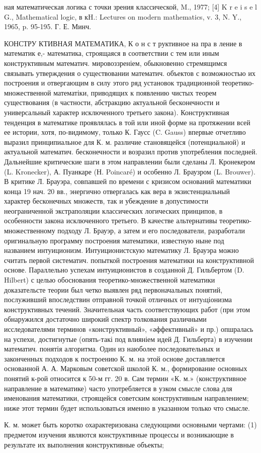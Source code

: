 \documentclass[10pt]{article}
\begin{document}
ная математическая логика с точки зрения классической, M., 1977; [4] K r e i s e l G., Mathematical logic, в кH.: Lectures on modern mathematics, v. 3, N. Y., 1965, p. 95-195. Г. Е. Минч.



КОНСТРУ КТИВНАЯ МАТЕМАТИКА, К о н с т руктивное на пра в ление в математик е,- математика, строящаяся в соответствии с тем или иным конструктивным математич. мировоззреніем, обыкновенно стремящимся связывать утверждения о существовании математич. объектов с возможностью их построения и отвергающим в силу этого ряд установок традиционной теоретико-множественной математіки, приводящих к появлению чистых теорем существования (в частности, абстракцию актуальной бесконечности и универсальный характер исключенного третьего закона). Конструктивная тенденция в математике проявлялась в той или иной форме на протяжении всей ее истории, хотя, по-видимому, только К. Гаусс (C. Gauss) впервые отчетливо выразил принципиальное для К. м. различие становящейся (потенциальной) и актуальной математич. бесконечности и возразил против употребления последней. Дальнейшие критические шаги в этом направлении были сделаны Л. Кронекером (L. Kronecker), А. Пуанкаре (Н. Poincaré) и особенно Л. Браузром (L. Brouwer). В критике Л. Брауэра, совпавшей по времени с кризисом оснований математики конца 19 нач. 20 вв., энергично отвергалась как вера в экзистенциальный характер бесконечных множеств, так и убеждение в допустимости неограниченной экстраполяции классических логических принципов, в особенности закона исключенного третьего. В качестве альтернативы теоретико-множественному подходу Л. Брауэр, а затем и его последователи, разработали оригинальную программу построения математики, известную ныне под названием интуиционизм. Интуиционистскую математику Л. Брауэра можно считать первой систематич. попыткой построения математики на конструктивной основе. Параллельно успехам интуиционистов в созданной Д. Гильбертом (D. Hilbert) с целью обоснования теоретико-множественной математики доказательсте теории был четко выявлен ряд первоначальных понятий, послуживший впоследствин отправной точкой отличных от интуıціонизма конструктивных течений. Значительная часть соответствующих работ (при этом обнаружился достаточно широкий спектр толкования различными исследователями терминов «конструктивный», «әффективный» и пр.) опшралась на успехи, достигнутые (опять-такі под влияніем идей Д. Гильберта) в изучении математич. понятія алгоритма. Один из наюболее последовательных и законченных подходов к построению К. м. на этой основе доставляется основанной А. А. Марковым советской школой К. м., формирование основных понятий к-рой относится к 50-м гг. 20 в. Сам термин «К. м.» (конструктивное направление в математике) часто употребляется в узком смысле слова для именования математики, строящейся советским конструктивным направлением; ниже этот термин будет использоваться именно в указанном только что смысле.



К. м. может быть коротко охарактеризована следующими основными чертами: (1) предметом изучения являются конструктивные процессы и возникающие в результате их выполнения конструктивные объекты;
\end{document}

